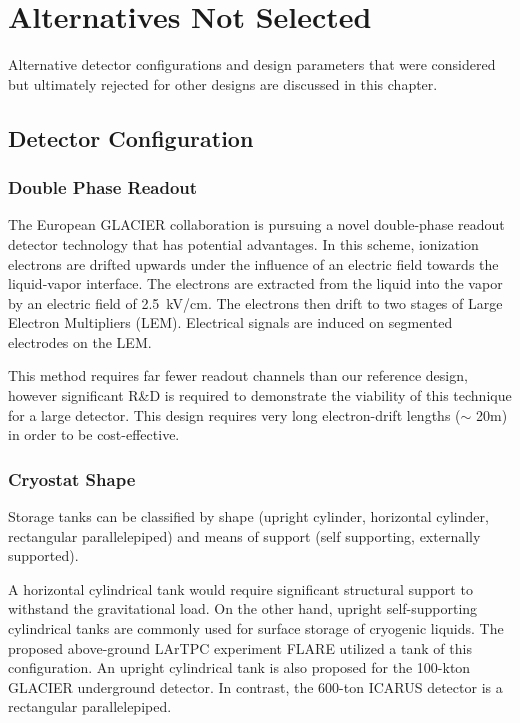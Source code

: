 %
%


\chapter{Alternatives Not Selected} %
\label{ch:alternatives}

Alternative detector configurations and design parameters %
that were considered but ultimately rejected for other designs are discussed in this chapter.

\section{Detector Configuration}
\subsection{Double Phase Readout}

The European GLACIER collaboration is pursuing a novel double-phase readout detector technology that has potential advantages. In this scheme, ionization electrons are drifted upwards under the influence of an electric field towards the liquid-vapor interface. The electrons are extracted from the liquid into the vapor by an electric field of 2.5~kV/cm. The electrons then drift to two stages of Large Electron Multipliers (LEM). Electrical signals are induced on segmented electrodes on the LEM. 

This method requires far fewer readout channels than %
our reference design, however significant R\&D is required to demonstrate the viability of this technique for a large detector. This design requires very long electron-drift lengths ($\sim$ 20m) in order to be cost-effective.

\subsection{Cryostat Shape}

Storage tanks can be classified by shape (upright cylinder, horizontal cylinder, rectangular parallelepiped) and means of support (self supporting, externally supported).

A horizontal cylindrical tank would require significant structural support to withstand the gravitational load.  On the other hand, upright self-supporting cylindrical tanks are commonly used for surface storage of cryogenic liquids. The proposed above-ground LArTPC experiment FLARE utilized a tank of this configuration. An upright cylindrical tank is also proposed for the 100-kton GLACIER underground detector. In contrast, the 600-ton ICARUS detector is a rectangular parallelepiped. 

